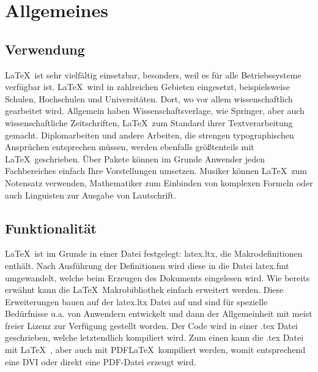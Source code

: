 \section{Allgemeines} \label{chap:2}

\subsection{Verwendung}
\LaTeX\ ist sehr vielfältig einsetzbar, besonders, weil es für alle Betriebssysteme verfügbar ist. \LaTeX\ wird in zahlreichen Gebieten eingesetzt, beispielsweise Schulen, Hochschulen und Universitäten. Dort, wo vor allem wissenschaftlich gearbeitet wird. Allgemein haben Wissenschaftsverlage, wie Springer, aber auch wissenschaftliche Zeitschriften, \LaTeX\ zum Standard ihrer Textverarbeitung gemacht. Diplomarbeiten und andere Arbeiten, die strengen typographischen Ansprüchen entsprechen müssen, werden ebenfalls größtenteils mit \LaTeX\ geschrieben. 
Über Pakete können im Grunde Anwender jeden Fachbereiches einfach Ihre Vorstellungen umsetzen. Musiker können \LaTeX\ zum Notensatz verwenden, Mathematiker zum Einbinden von komplexen Formeln oder auch Linguisten zur Ausgabe von Lautschrift. 

\subsection{Funktionalität}
\LaTeX\ ist im Grunde in einer Datei festgelegt: latex.ltx, die Makrodefinitionen enthält. Nach Ausführung der Definitionen wird diese in die Datei latex.fmt umgewandelt, welche beim Erzeugen des Dokuments eingelesen wird. Wie bereits erwähnt kann die \LaTeX\ Makrobibliothek einfach erweitert werden. Diese Erweiterungen bauen auf der latex.ltx Datei auf und sind für spezielle Bedürfnisse u.a. von Anwendern entwickelt und dann der Allgemeinheit mit meist freier Lizenz zur Verfügung gestellt worden. Der Code wird in einer .tex Datei geschrieben, welche letztendlich kompiliert wird. Zum einen kann die .tex Datei mit \LaTeX\ , aber auch mit PDF\LaTeX\ kompiliert werden, womit entsprechend eine DVI oder direkt eine PDF-Datei erzeugt wird.  \cite[vgl.][S.3f]{Oechsner2015}


